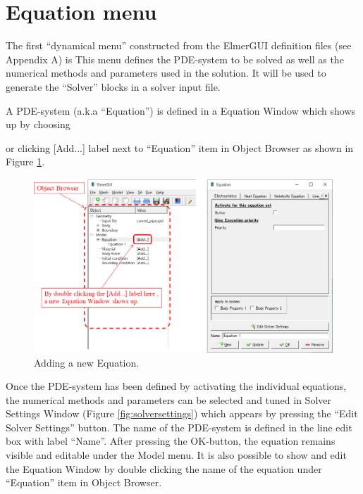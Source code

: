 \section{Equation menu}

The first ``dynamical menu'' constructed from the ElmerGUI definition files (see Appendix A) is
\noindent This menu defines the PDE-system to be solved as well as the numerical
methods and parameters used in the solution. It will be used to generate the ``Solver''
blocks in a solver input file.

A PDE-system (a.k.a ``Equation'') is defined in a Equation Window which shows up by choosing

\noindent or clicking [Add...] label next to ``Equation'' item in Object Browser as shown in Figure \ref{fig:equation}.

\begin{figure}[htb]
\begin{center}
 \includegraphics[scale=0.5]{images/equation.png}
\caption{Adding a new Equation.}
\label{fig:equation}
\end{center}
\end{figure}

Once the PDE-system has been defined by activating the individual equations, the numerical
methods and parameters can be selected and tuned in Solver Settings Window (Figure \ref{fig:solversettings}) which appears by pressing the ``Edit Solver Settings'' button.
The name of the PDE-system is defined in the line edit box with label ``Name''. After pressing
the OK-button, the equation remains visible and editable under the Model menu. 
It is also possible to show and edit the Equation Window by double clicking the name of the equation under ``Equation'' item in Object Browser.

